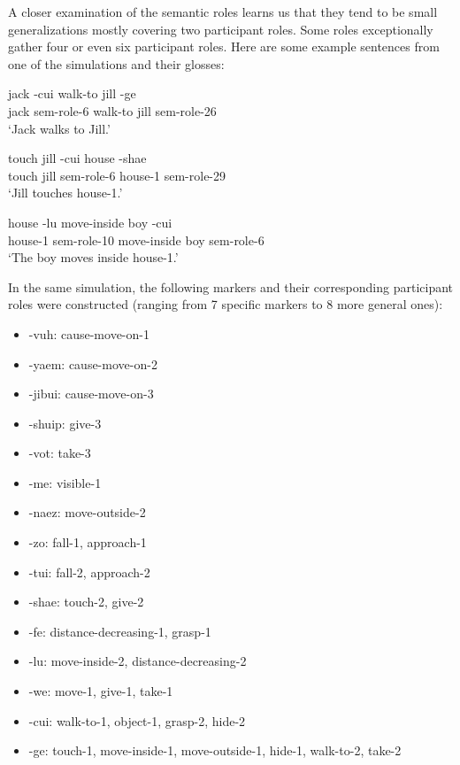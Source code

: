 A closer examination of the semantic roles learns us that they tend to be small generalizations mostly covering two participant roles. Some roles exceptionally gather four or even six participant roles. Here are some example sentences from one of the simulations and their glosses:

\ea
\gll jack -cui walk-to jill -ge \\
jack sem-role-6 walk-to  jill sem-role-26 \\
\glt `Jack walks to Jill.' \\

\item
\gll touch jill -cui house -shae \\
touch jill sem-role-6 house-1 sem-role-29 \\
\glt `Jill touches house-1.' \\

\item
\gll house -lu move-inside boy -cui \\
house-1 sem-role-10 move-inside boy sem-role-6 \\
\glt `The boy moves inside house-1.' \\

\z

In the same simulation, the following markers and their corresponding participant roles were constructed (ranging from 7 specific markers to 8 more general ones):

\begin{itemize}
\item -vuh: cause-move-on-1
\item -yaem: cause-move-on-2
\item -jibui: cause-move-on-3
\item -shuip: give-3
\item -vot: take-3
\item -me: visible-1
\item -naez: move-outside-2
\item -zo: fall-1, approach-1
\item -tui: fall-2, approach-2
\item -shae: touch-2, give-2
\item -fe: distance-decreasing-1, grasp-1
\item -lu: move-inside-2, distance-decreasing-2
\item -we: move-1, give-1, take-1
\item -cui: walk-to-1, object-1, grasp-2, hide-2
\item -ge: touch-1, move-inside-1, move-outside-1, hide-1, walk-to-2, take-2
\end{itemize}

